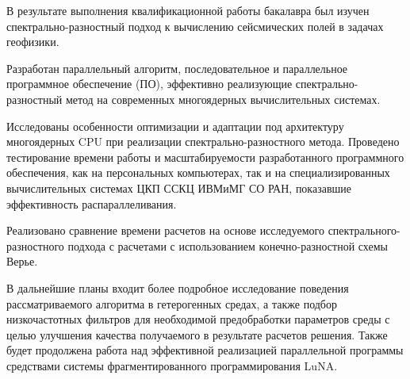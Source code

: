 
В результате выполнения квалификационной работы бакалавра был изучен спектрально-разностный подход к вычислению сейсмических полей в задачах геофизики.

Разработан параллельный алгоритм, последовательное и параллельное программное обеспечение (ПО), эффективно реализующие спектрально-
разностный метод на современных многоядерных вычислительных системах.

Исследованы особенности оптимизации и адаптации под архитектуру многоядерных CPU при реализации спектрально-разностного метода. Проведено тестирование времени работы и масштабируемости разработанного программного обеспечения, как на персональных компьютерах,
так и на специализированных вычислительных системах ЦКП ССКЦ ИВМиМГ СО РАН, показавшие эффективность распараллеливания.

Реализовано сравнение времени расчетов на основе исследуемого спектрального-разностного подхода с расчетами с использованием конечно-разностной схемы Верье. 

В дальнейшие планы входит более подробное исследование поведения рассматриваемого алгоритма в гетерогенных средах,
а также подбор низкочастотных фильтров для необходимой предобработки параметров среды с целью улучшения качества получаемого в результате расчетов решения.
Также будет продолжена работа над эффективной реализацией параллельной программы
средствами системы фрагментированного программирования LuNA.

\clearpage
